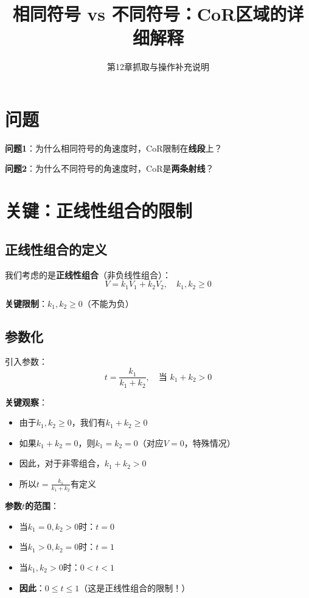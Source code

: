 \documentclass[12pt,a4paper]{article}
\title{相同符号 vs 不同符号：CoR区域的详细解释}
\author{第12章抓取与操作补充说明}
\date{}
\begin{document}
\maketitle

\section{问题}

\textbf{问题1}：为什么相同符号的角速度时，CoR限制在\textbf{线段}上？

\textbf{问题2}：为什么不同符号的角速度时，CoR是\textbf{两条射线}？

\section{关键：正线性组合的限制}

\subsection{正线性组合的定义}

我们考虑的是\textbf{正线性组合}（非负线性组合）：
\begin{equation}
V = k_1 V_1 + k_2 V_2, \quad k_1, k_2 \geq 0
\label{eq:positive_combination}
\end{equation}

\textbf{关键限制}：$k_1, k_2 \geq 0$（不能为负）

\subsection{参数化}

引入参数：
\begin{equation}
t = \frac{k_1}{k_1 + k_2}, \quad \text{当 } k_1 + k_2 > 0
\end{equation}

\textbf{关键观察}：
\begin{itemize}
\item 由于$k_1, k_2 \geq 0$，我们有$k_1 + k_2 \geq 0$
\item 如果$k_1 + k_2 = 0$，则$k_1 = k_2 = 0$（对应$V = 0$，特殊情况）
\item 因此，对于非零组合，$k_1 + k_2 > 0$
\item 所以$t = \frac{k_1}{k_1 + k_2}$有定义
\end{itemize}

\textbf{参数$t$的范围}：
\begin{itemize}
\item 当$k_1 = 0, k_2 > 0$时：$t = 0$
\item 当$k_1 > 0, k_2 = 0$时：$t = 1$
\item 当$k_1, k_2 > 0$时：$0 < t < 1$
\item \textbf{因此}：$0 \leq t \leq 1$（这是正线性组合的限制！）
\end{itemize}
\end{document}

